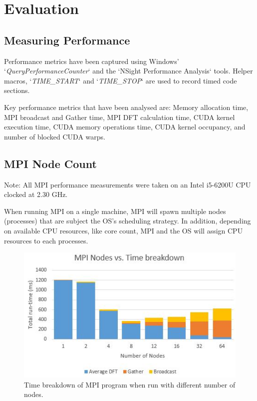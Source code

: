 \documentclass[11pt,a4paper]{article}
\begin{document}
\section{Evaluation}
\subsection{Measuring Performance}
Performance metrics have been captured using Windows' `\textit{QueryPerformanceCounter}` and the `NSight Performance Analysis` tools. Helper macros, `\textit{TIME\_START}` and `\textit{TIME\_STOP}` are used to record timed code sections.

Key performance metrics that have been analysed are: Memory allocation time, MPI broadcast and Gather time, MPI DFT calculation time, CUDA kernel execution time, CUDA memory operations time, CUDA kernel occupancy, and number of blocked CUDA warps.

\subsection{MPI Node Count}
Note: All MPI performance measurements were taken on an Intel i5-6200U CPU clocked at 2.30 GHz.

When running MPI on a single machine, MPI will spawn multiple nodes (processes) that are subject the OS's scheduling strategy. In addition, depending on available CPU resources, like core count, MPI and the OS will assign CPU resources to each processes.

\begin{figure}
\begin{center}
\includegraphics[scale=0.7]{mpi_eval_nodes}
\end{center}
\caption{Time breakdown of MPI program when run with different number of nodes.}
\label{fig:mpi_eval_nodes}
\end{figure}
\end{document}
